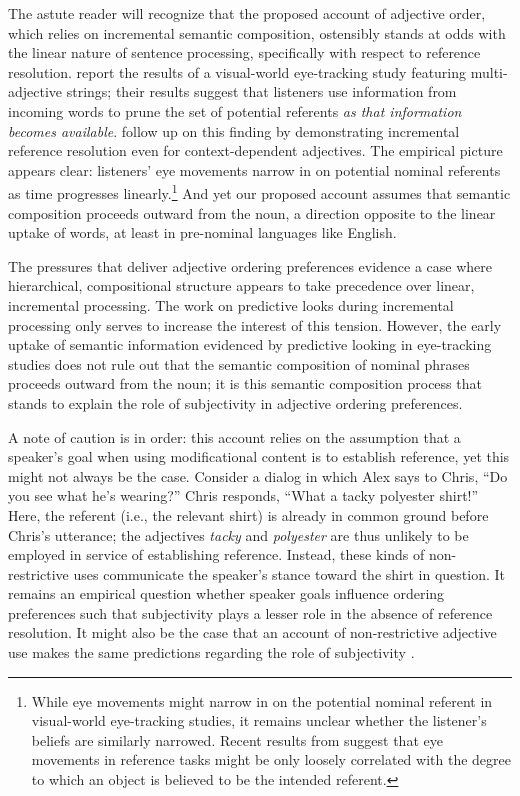 \documentclass{sp}
\begin{document}
The astute reader will recognize that the proposed account of adjective order, which relies on incremental semantic composition, ostensibly stands at odds with the linear nature of sentence processing, specifically with respect to reference resolution. \cite{eberhardetal1995} report the results of a visual-world eye-tracking study featuring multi-adjective strings; their results suggest that listeners use information from incoming words to prune the set of potential referents \emph{as that information becomes available}. \cite{sedivyetal1999} follow up on this finding by demonstrating incremental reference resolution even for context-dependent adjectives. The empirical picture appears clear: listeners' eye movements narrow in on potential nominal referents as time progresses linearly.\footnote{While eye movements might narrow in on the potential nominal referent in visual-world eye-tracking studies, it remains unclear whether the listener's beliefs are similarly narrowed. Recent results from \cite{qingetal2018} suggest that eye movements in reference tasks might be only loosely correlated with the degree to which an object is believed to be the intended referent. 
} 
And yet our proposed account assumes that semantic composition proceeds outward from the noun, a direction opposite to the linear uptake of words, at least in pre-nominal languages like English.

The pressures that deliver adjective ordering preferences evidence a case where hierarchical, compositional structure appears to take precedence over linear, incremental processing. The work on predictive looks during incremental processing only serves to increase the interest of this tension. However, the early uptake of semantic information evidenced by predictive looking in eye-tracking studies does not rule out that the semantic composition of nominal phrases proceeds outward from the noun; it is this semantic composition process that stands to explain the role of subjectivity in adjective ordering preferences. 


A note of caution is in order: this account relies on the assumption that a speaker's goal when using modificational content is to establish reference, yet this might not always be the case.  Consider a dialog in which Alex says to Chris, ``Do you see what he's wearing?'' Chris responds, ``What a tacky polyester shirt!'' Here, the referent (i.e., the relevant shirt) is already in common ground before Chris's utterance; the adjectives \emph{tacky} and \emph{polyester} are thus unlikely to be employed in  service of establishing reference. Instead, these kinds of non-restrictive uses communicate the speaker's stance toward the shirt in question. It remains an empirical question whether speaker goals influence ordering preferences such that subjectivity plays a lesser role in the absence of reference resolution. It might also be the case that an account of non-restrictive adjective use makes the same predictions regarding the role of subjectivity \citep[cf.][]{hahnetal2018}. 
\end{document}
